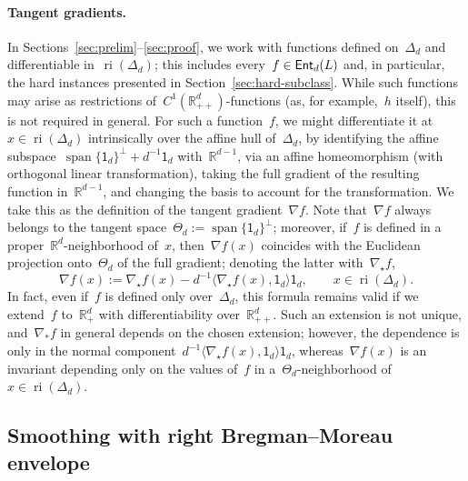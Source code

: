 \documentclass[11pt]{article}
\numberwithin{equation}{section}
\theoremstyle{remark}
\newcommand{\R}{\mathbb{R}}
\newcommand{\ones}{\mathsf{1}_d}
\newcommand{\ri}{\operatorname{ri}}
\newcommand{\Ent}{\textup{\textsf{Ent}}}
\newcommand{\Fh}{\Ent_d}
\newcommand{\Simp}{\Delta_d}
\newcommand{\Tan}{\Theta_d}
\newcommand{\spanof}[1]{\operatorname{span}\{#1\}}
\newcommand{\1}{\mathbf{1}}
\newcommand{\bnabla}{\nabla}
\begin{document}
\paragraph{Tangent gradients.}
In Sections~\ref{sec:prelim}--\ref{sec:proof}, we work with functions defined on~$\Simp$ and differentiable in~$\ri(\Simp)$; this includes every~$f \in \Fh(L)$ and, in particular, the hard instances presented in Section~\ref{sec:hard-subclass}. 
While such functions may arise as restrictions of~$C^1(\R_{++}^d)$-functions (as, for example,~$h$ itself), this is not required in general. For such a function~$f$, we might differentiate it at~$x \in \ri(\Simp)$ intrinsically over the affine hull of~$\Simp$, by identifying the affine subspace~$\spanof{\ones}^{\perp} + d^{-1} \ones$  with~$\R^{d-1}$, via an affine homeomorphism (with orthogonal linear transformation), taking the full gradient of the resulting function in~$\R^{d-1}$, and changing the basis to account for the transformation. 
We take this as the definition of the tangent gradient~$\bnabla f$. 
Note that~$\bnabla f$ always belongs to the tangent space~$\Tan := \spanof{\ones}^\perp$; moreover, if~$f$ is defined in a proper~$\R^d$-neighborhood of~$x$, then~$\bnabla f(x)$ coincides with the Euclidean projection onto~$\Tan$ of the full gradient; denoting the latter with~$\nabla_\star f$, 
\begin{equation}
\label{eq:grad-tangent}
\bnabla f(x) := \nabla_\star f(x) - d^{-1}  \langle \nabla_\star f(x), \ones\rangle \ones, \qquad x \in \ri(\Simp).
\end{equation}
In fact, even if~$f$ is defined only over~$\Simp$, this formula remains valid if we extend~$f$ to~$\R^d_+$ with differentiability over~$\R^d_{++}$. Such an extension is not unique, and~$\nabla_* f$ in general depends on the chosen extension; however,  the dependence is only in the normal component~$d^{-1}\langle \nabla_\star f(x), \ones \rangle \ones$, whereas~$\bnabla f(x)$ is an invariant depending only on the values of~$f$ in a~$\Tan$-neighborhood of~$x \in \ri(\Simp)$.




\subsection{Smoothing with right Bregman--Moreau envelope}
\label{sec:envelope}
\end{document}

